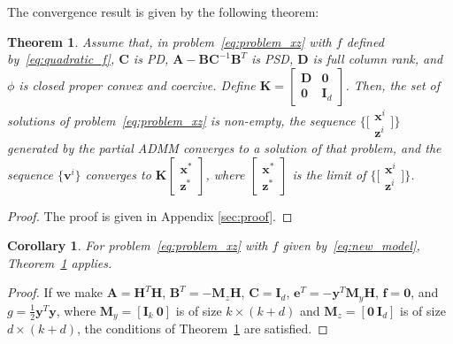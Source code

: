 \documentclass[10pt,twocolumn,twoside]{IEEEtran}
\newcommand{\Hm}{\mathbf{H}} %
\newcommand{\y}{\mathbf{y}} %
\newcommand{\x}{\mathbf{x}} %
\newcommand{\z}{\mathbf{z}} %
\newcommand{\vs}{\mathbf{v}} %
\newcommand{\D}{\mathbf{D}} %
\newcommand{\A}{\mathbf{A}} %
\newcommand{\B}{\mathbf{B}} %
\newcommand{\C}{\mathbf{C}} %
\newcommand{\e}{\mathbf{e}} %
\newcommand{\f}{\mathbf{f}} %
\newcommand{\M}{\mathbf{M}} %
\newcommand{\I}{\mathbf{I}} %
\newcommand{\K}{\mathbf{K}} %
\newtheorem{theorem}{Theorem}
\newtheorem{corollary}{Corollary}
\begin{document}
The convergence result is given by the following theorem:

\begin{theorem} \label{th:main}
	Assume that, in problem~\eqref{eq:problem_xz} with $f$ defined by~\eqref{eq:quadratic_f}, $\C$ is PD, $\A - \B \C^{-1} \B^T$ is PSD, $\D$ is full column rank, and $\phi$ is closed proper convex and coercive. Define $\K = \left[\begin{smallmatrix} \D & \mathbf{0} \\ \mathbf{0} & \I_{d} \end{smallmatrix} \right]$. Then, the set of solutions of problem~\eqref{eq:problem_xz} is non-empty, the sequence $\big\{\big[\begin{smallmatrix} \x^i \\ \z^i \end{smallmatrix}\big]\big\}$ generated by the partial ADMM converges to a solution of that problem, and the sequence $\{\vs^i\}$ converges to $\K \left[\begin{smallmatrix} \x^* \\ \z^* \end{smallmatrix}\right]$, where $\left[\begin{smallmatrix} \x^* \\ \z^* \end{smallmatrix}\right]$ is the limit of $\big\{\big[\begin{smallmatrix} \x^i \\ \z^i \end{smallmatrix}\big]\big\}$.
\end{theorem}

\begin{proof}
The proof is given in Appendix \ref{sec:proof}.
\end{proof}

\begin{corollary} \label{th:corollary}
	For problem~\eqref{eq:problem_xz} with $f$ given by~\eqref{eq:new_model}, Theorem~\ref{th:main} applies.
\end{corollary}

\begin{proof}
	If we make $\A = \Hm^T \Hm$, $\B^T = - \M_z \Hm$, $\C = \I_d$, $\e^T = - \y^T \M_y \Hm$, $\f = \mathbf{0}$, and $g = \frac{1}{2} \y^T \y$, where $\M_y = [\I_k~\mathbf 0]$ is of size $k \times (k+d)$ and $\M_z = [\mathbf 0~\I_d]$ is of size $d \times (k+d)$, the conditions of Theorem~\ref{th:main} are satisfied.
\end{proof}
\end{document}
